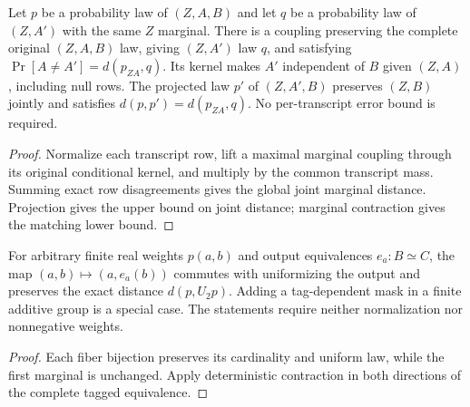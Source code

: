\begin{theorem}
  \label{thm:lowerbounds-algebraic-conditional-coupling}
  \leanok
  Let $p$ be a probability law of $(Z,A,B)$ and let $q$ be a probability
  law of $(Z,A')$ with the same $Z$ marginal. There is a coupling
  preserving the complete original $(Z,A,B)$ law, giving $(Z,A')$ law
  $q$, and satisfying
  $\Pr[A\ne A']=d(p_{ZA},q)$. Its kernel makes $A'$ independent of
  $B$ given $(Z,A)$, including null rows. The projected law $p'$ of
  $(Z,A',B)$ preserves $(Z,B)$ jointly and satisfies
  $d(p,p')=d(p_{ZA},q)$. No per-transcript error bound is required.
\end{theorem}
\begin{proof}
  \leanok
  Normalize each transcript row, lift a maximal marginal coupling
  through its original conditional kernel, and multiply by the common
  transcript mass. Summing exact row disagreements gives the global
  joint marginal distance. Projection gives the upper bound on joint
  distance; marginal contraction gives the matching lower bound.
\end{proof}

\begin{theorem}
  \label{thm:lowerbounds-algebraic-output-bijections}
  \leanok
  For arbitrary finite real weights $p(a,b)$ and output equivalences
  $e_a:B\simeq C$, the map $(a,b)\mapsto(a,e_a(b))$ commutes with
  uniformizing the output and preserves the exact distance $d(p,U_2p)$.
  Adding a tag-dependent mask in a finite additive group is a special case.
  The statements require neither normalization nor nonnegative weights.
\end{theorem}
\begin{proof}
  \leanok
  Each fiber bijection preserves its cardinality and uniform law, while
  the first marginal is unchanged. Apply deterministic contraction in
  both directions of the complete tagged equivalence.
\end{proof}

